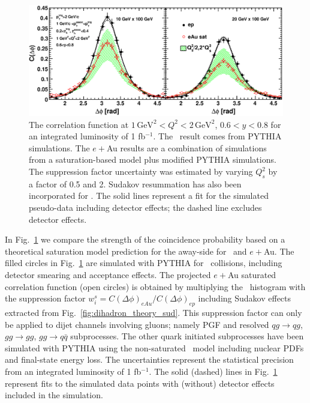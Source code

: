 \begin{figure}[hbt]
\begin{center}
\includegraphics[width=1.0\textwidth]{plots/chpt6/Q2_1_y_0.7_varying_Qs_uncertainty_Sud_withfit_smear.eps} 
\end{center} 
\caption[The predicted discrimination power of the dihadron correlation function in \ep\ and \eA\ at EIC energy scale under a reasonable statistical uncertainty]{The correlation
function at $1\, \textrm{GeV}^{2}<Q^{2}<2 \, \textrm{GeV}^{2}$, $0.6<y<0.8$ for an  
integrated luminosity of 1 fb$^{-1}$. The \ep\ result comes from PYTHIA simulations.
The $e+$Au results are a combination of simulations from a saturation-based model plus modified
PYTHIA simulations. The suppression factor uncertainty was estimated by varying
$Q_{s}^{2}$ by a factor of 0.5 and 2. Sudakov resummation has also been incorporated
for \eAu. The solid lines represent a fit for the simulated pseudo-data
including detector effects; the dashed line excludes detector effects.}
\label{fig:correUncertainSud}
\end{figure}

In Fig.~\ref{fig:correUncertainSud} we compare the strength of the
coincidence probability based on a theoretical saturation model prediction for
the away-side for \ep\ and $e+$Au. The filled circles in
Fig.~\ref{fig:correUncertainSud} are simulated with PYTHIA
for \ep\ collisions, including detector smearing and acceptance effects.
The projected $e+$Au saturated correlation function (open circles) is
obtained by multiplying the \ep\ histogram with the suppression factor
$w^{s}_{i}=C(\Delta\phi)_{eAu}/C(\Delta\phi)_{ep}$ including Sudakov effects extracted
from Fig.~\ref{fig:dihadron_theory_sud}. This suppression factor can only be applied to
dijet channels involving gluons; namely PGF and resolved $qg\rightarrow qg$,
$gg\rightarrow gg$, $gg\rightarrow q\bar q$ subprocesses. The other quark
initiated subprocesses have been simulated with PYTHIA using the non-saturated
\eA\ model including nuclear PDFs and final-state energy loss. The uncertainties
represent the statistical precision from an integrated luminosity of 1
fb$^{-1}$. The solid (dashed) lines in Fig.~\ref{fig:correUncertainSud} represent
fits to the simulated data points with (without) detector effects included in
the simulation.

